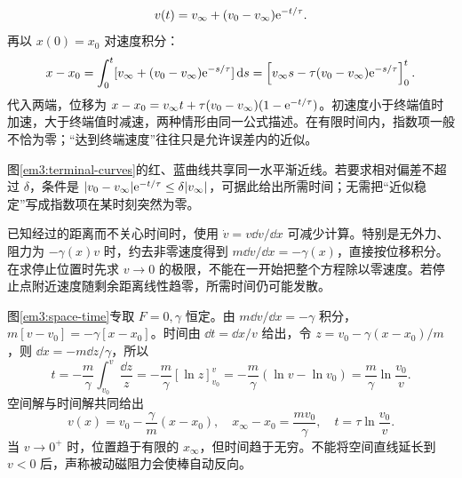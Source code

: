 \[v(t)=v_\infty+(v_0-v_\infty)\mathrm e^{-t/\tau}.\]
再以 $x(0)=x_0$ 对速度积分：
\[
x-x_0=\int_0^t[v_\infty+(v_0-v_\infty)\mathrm e^{-s/\tau}]\mathop{}\!\mathrm d s
=\left[v_\infty s-\tau(v_0-v_\infty)\mathrm e^{-s/\tau}\right]_0^t.
\]
代入两端，位移为 $x-x_0=v_\infty t+\tau(v_0-v_\infty)(1-\mathrm e^{-t/\tau})$。初速度小于终端值时加速，大于终端值时减速，两种情形由同一公式描述。在有限时间内，指数项一般不恰为零；“达到终端速度”往往只是允许误差内的近似。


图\ref{em3:terminal-curves}的红、蓝曲线共享同一水平渐近线。若要求相对偏差不超过 $\delta$，条件是 $|v_0-v_\infty|\mathrm e^{-t/\tau}\le\delta|v_\infty|$，可据此给出所需时间；无需把“近似稳定”写成指数项在某时刻突然为零。



已知经过的距离而不关心时间时，使用 $\dot v=v\dd v/\dd x$ 可减少计算。特别是无外力、阻力为 $-\gamma(x)v$ 时，约去非零速度得到 $m\dd v/\dd x=-\gamma(x)$，直接按位移积分。在求停止位置时先求 $v\to0$ 的极限，不能在一开始把整个方程除以零速度。若停止点附近速度随剩余距离线性趋零，所需时间仍可能发散。


图\ref{em3:space-time}专取 $F=0,\gamma$ 恒定。由 $m\dd v/\dd x=-\gamma$ 积分，
$m[v-v_0]=-\gamma[x-x_0]$。时间由 $\dd t=\dd x/v$ 给出，令 $z=v_0-\gamma(x-x_0)/m$，则 $\dd x=-m\dd z/\gamma$，所以
\[
t=-\frac m\gamma\int_{v_0}^{v}\frac{\dd z}{z}
=-\frac m\gamma[\ln z]_{v_0}^{v}
=-\frac m\gamma(\ln v-\ln v_0)
=\frac m\gamma\ln\frac{v_0}{v}.
\]
空间解与时间解共同给出
\[
v(x)=v_0-\frac\gamma m(x-x_0),\quad
x_\infty-x_0=\frac{mv_0}{\gamma},\quad
t=\tau\ln\frac{v_0}{v}.
\]
当 $v\to0^+$ 时，位置趋于有限的 $x_\infty$，但时间趋于无穷。不能将空间直线延长到 $v<0$ 后，声称被动磁阻力会使棒自动反向。

